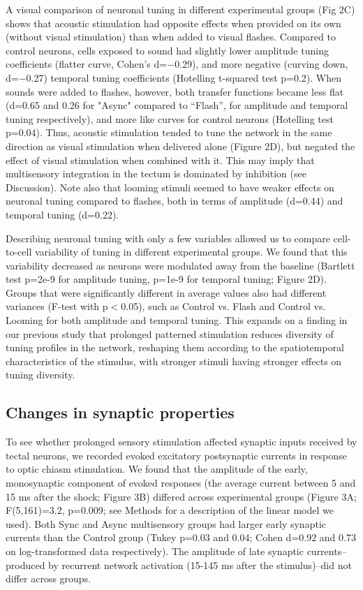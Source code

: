 \documentclass{article}
\begin{document}
A visual comparison of neuronal tuning in different experimental groups (Fig 2C) shows that acoustic stimulation had opposite effects when provided on its own (without visual stimulation) than when added to visual flashes. Compared to control neurons, cells exposed to sound had slightly lower amplitude tuning coefficients (flatter curve, Cohen’s d=$-$0.29), and more negative (curving down, d=$-$0.27) temporal tuning coefficients (Hotelling t-squared test p=0.2). When sounds were added to flashes, however, both transfer functions became less flat (d=0.65 and 0.26 for "Async" compared to “Flash”, for amplitude and temporal tuning respectively), and more like curves for control neurons (Hotelling test p=0.04). Thus, acoustic stimulation tended to tune the network in the same direction as visual stimulation when delivered alone (Figure 2D), but negated the effect of visual stimulation when combined with it. This may imply that multisensory integration in the tectum is dominated by inhibition (see Discussion). Note also that looming stimuli seemed to have weaker effects on neuronal tuning compared to flashes, both in terms of amplitude (d=0.44) and temporal tuning (d=0.22).

Describing neuronal tuning with only a few variables allowed us to compare cell-to-cell variability of tuning in different experimental groups. We found that this variability decreased as neurons were modulated away from the baseline (Bartlett test p=2e-9 for amplitude tuning, p=1e-9 for temporal tuning; Figure 2D). Groups that were significantly different in average values also had different variances (F-test with p$<$0.05), such as Control vs. Flash and Control vs. Looming for both amplitude and temporal tuning. This expands on a finding in our previous study \citep{ciarleglio2015} that prolonged patterned stimulation reduces diversity of tuning profiles in the network, reshaping them according to the spatiotemporal characteristics of the stimulus, with stronger stimuli having stronger effects on tuning diversity.

\subsection*{Changes in synaptic properties}

To see whether prolonged sensory stimulation affected synaptic inputs received by tectal neurons, we recorded evoked excitatory postsynaptic currents in response to optic chiasm stimulation. We found that the amplitude of the early, monosynaptic component of evoked responses (the average current between 5 and 15 ms after the shock; Figure 3B) differed across experimental groups (Figure 3A; F(5,161)=3.2, p=0.009; see Methods for a description of the linear model we used). Both Sync and Async multisensory groups had larger early synaptic currents than the Control group (Tukey p=0.03 and 0.04; Cohen d=0.92 and 0.73 on log-transformed data respectively). The amplitude of late synaptic currents–produced by recurrent network activation (15-145 ms after the stimulus)–did not differ across groups.
\end{document}
